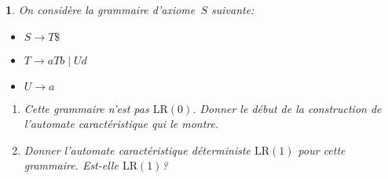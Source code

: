 \documentclass[a4paper,10pt,french]{article}
\newcommand{\LR}{\mathrm{LR}}
\def\mybox#1#2{\fbox{\parbox[b][#1][b]{#2}{~}}}
\newtheorem{exi}{}
\newenvironment{exo}{\begin{exi}\em}{\end{exi}}
\begin{document}

\begin{exo}
On considère la grammaire d'axiome~$S$ suivante:
\begin{itemize}
\item[] $S \rightarrow T\$$
\item[] $T \rightarrow aTb \mid Ud$
\item[] $U \rightarrow a$
\end{itemize}
\begin{enumerate}
\item Cette grammaire n'est pas $\LR(0)$. Donner le début de la construction
de l'automate caractéristique qui le montre.

\mybox{4cm}{\linewidth}

\item Donner l'automate caractéristique déterministe $\LR(1)$ pour cette
grammaire. Est-elle $\LR(1)$?

\mybox{9cm}{\linewidth}

\end{enumerate}

\end{exo}
\end{document}
